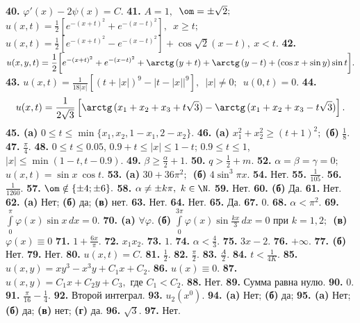 \documentclass[a4paper]{article}
\def\a{\alpha}
\def\b{\beta}
\def\g{\gamma}
\def\fy{\varphi}
\begin{document}
\noindent
{\bf 40.} $\fy'(x)-2\psi(x)=C.$
{\bf 41.} $A=1,$\ $\om=\pm\sqrt{2};\ $
$u(x,t)=\displaystyle{\frac{1}{2}}\left[
e^{-(x+t)^2}+e^{-(x-t)^2}\right],$\ $x\ge t;$\
$u(x,t)=\displaystyle{\frac{1}{2}}\left[e^{-(x+t)^2}-e^{-(x-t)^2}\right] +
\cos\sqrt{2}(x-t),\ x< t.$
{\bf 42.} $u(x,y,t)=\displaystyle{\frac{1}{2}}\bigg[
e^{-(x+t)^2}+e^{-(x-t)^2}+\arctg \,(y+t)+\arctg \,
(y-t)+ (\cos x+\sin y)\sin t\bigg].$
{\bf 43.} $u(x,t)=\displaystyle{\frac{1}{18|x|}}\left[
(t+|x|)^9-\left|t-|x|\right|^9\right],$\ $|x|\neq0;$\ $u(0,t)=0.$
{\bf 44.}
$$u(x,t)=\frac{1}{2\sqrt3}\left[\arctg \,(x_1+x_2+x_3+t\sqrt3)-\arctg \,(x_1+x_2+x_3-t\sqrt3)\right].$$
{\bf 45. (a)} $0\le t \le \min\{x_1,x_2,1-x_1, 2-x_2\}.$
{\bf 46. (a)} $x_1^2+x_2^2\ge (t+1)^2;$
    {\bf (б)} $\displaystyle{\frac{1}{8}}.$
{\bf 47.} $\displaystyle{\frac{\pi}{4}}.$
{\bf 48.} $0\le t\le 0.05$, $0.9+t\le |x|\le 1-t$;
$0.9\le t\le 1$, $|x|\le\min(1-t,t-0.9)$.
{\bf 49.} $\b\ge \displaystyle{\frac{\a}{2}}+1.$
{\bf 50.} $q>\displaystyle{\frac{1}{2}}+m.$
{\bf 52.} $\a=\b=\g=0;$\ $u(x,t)=\sin x\ \cos t.$
{\bf 53. (a)} $30+36\pi^2;$\
    {\bf (б)} $4\sin^3\pi x.$
{\bf 54.} Нет.
{\bf 55.} $\displaystyle{\frac{1}{105}}.$
{\bf 56.} $\displaystyle{\frac{1}{1260}}.$
{\bf 57.} $\om\notin\{\pm4;\pm6\}.$
{\bf 58.} $\a\neq\pm k\pi,\ k\in\N.$
{\bf 59.} Нет.
{\bf 60. (б)} Да.
{\bf 61.} Нет.
{\bf 62. (a)} Нет;
    {\bf (б)} да;
    {\bf (в)} нет.
{\bf 63.} Нет.
{\bf 64.} Нет.
{\bf 65.} Да.
{\bf 67.} $0$.
{\bf 68.} $\a<\pi^2$.
{\bf 69.} $\displaystyle{\int\limits_{0}^{\pi}\fy(x)\sin x\, dx}=0.$
{\bf 70. (a)} $\forall \fy.$
    {\bf (б)} $\displaystyle{\int\limits_{0}^{3\pi}\fy(x)\sin \frac{kx}{3}}
    \, dx=0$ при $k=1,2;$\
    {\bf (в)} $\fy(x)\equiv 0$
{\bf 71.} $1+\displaystyle{\frac{6x}{\pi}}.$
{\bf 72.} $x_1x_2$.
{\bf 73.} $1$.
{\bf 74.} $\a<\displaystyle{\frac{4}{3}}.$
{\bf 75.} $3x-2$.
{\bf 76.} $+\infty$.
{\bf 77. (б)} Нет.
{\bf 79.} Нет.
{\bf 80.} $u(x,t)=C$.
{\bf 81.} $\displaystyle{\frac{1}{2}}.$
{\bf 82.} $\displaystyle{\frac{\pi}{2}}.$
{\bf 83.} $\displaystyle{\frac{A}{2}}.$
{\bf 84.} $t<\displaystyle{\frac{1}{4K}}.$
{\bf 85.} $u(x,y)=xy^3-x^3y+C_1x+C_2$.
{\bf 86.} $u(x)\equiv0$.
{\bf 87.} $u(x,y)=C_1x+C_2y+C_3,$ где $C_1<C_2$.
{\bf 88.} Нет.
{\bf 89.} Сумма равна нулю.
{\bf 90.} $0$.
{\bf 91.} $\displaystyle{\frac{\pi}{16}-\frac{1}{4}}.$
{\bf 92.} Второй интеграл.
{\bf 93.} $u_2(x^0)$.
{\bf 94. (a)} Нет;
    {\bf (б)} да;
{\bf 95. (a)} Нет;
    {\bf (б)} да;
    {\bf (в)} нет;
    {\bf (г)} да.
{\bf 96.} $\sqrt{3}$.
{\bf 97.} Нет.
\end{document}
